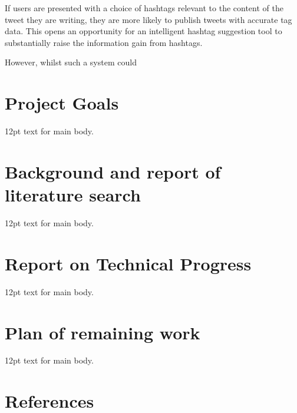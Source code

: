 \documentclass[12pt,a4paper]{article}
\begin{document}
If users are presented with a choice of hashtags relevant to the content of the tweet they are writing, they are more likely to publish tweets with accurate tag data. This opens an opportunity for an intelligent hashtag suggestion tool to substantially raise the information gain from hashtags.

However, whilst such a system could 
\pagebreak

\tableofcontents
\pagebreak

\setcounter{secnumdepth}{1}
\section{Project Goals}
12pt text for main body.
\pagebreak

\section{Background and report of literature search}
12pt text for main body.
\pagebreak

\section{Report on Technical Progress}
12pt text for main body.
\pagebreak

\section{Plan of remaining work}
12pt text for main body.
\pagebreak

\setcounter{secnumdepth}{0}
\section{References}
\end{document}

